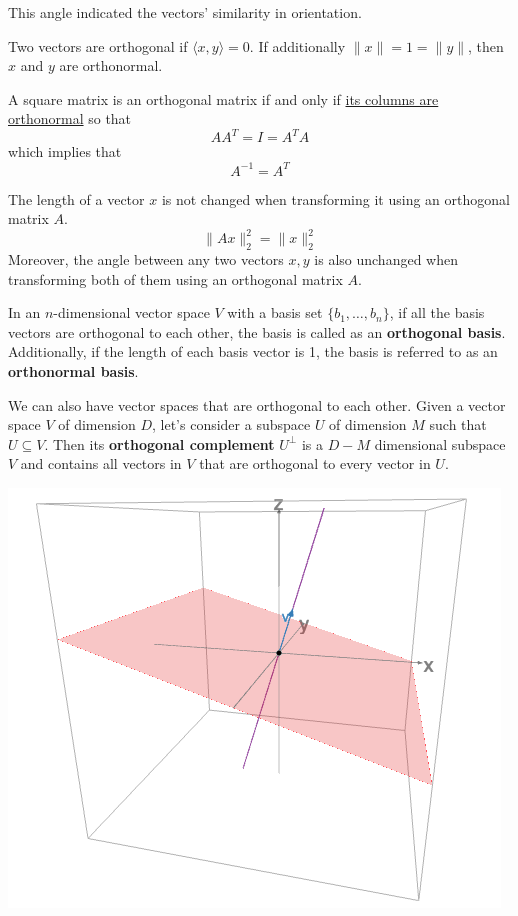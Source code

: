 \documentclass{article}
\begin{document}
This angle indicated the vectors' similarity in orientation. 
\begin{definition}
    Two vectors are orthogonal if $\langle x,y \rangle=0$. If additionally
    $\lVert x\rVert=1=\lVert y\rVert$, then $x$ and $y$ are orthonormal.
\end{definition}
\begin{definition}
    A square matrix is an orthogonal matrix if and only if \underline{its columns are
    orthonormal} so that 
    $$AA^T=I=A^TA$$
    which implies that 
    $$A^{-1}=A^T$$
\end{definition}
The length of a vector $x$ is not changed when transforming it using an
orthogonal matrix $A$.
$$\lVert Ax\rVert_2^2=\lVert x\rVert_2^2$$
Moreover, the angle between any two vectors $x,y$ is also unchanged when
transforming both of them using an orthogonal matrix $A$.
\begin{definition}
    In an $n$-dimensional vector space $V$ with a basis set
    $\{b_1,\ldots,b_n\}$, if all the basis vectors are orthogonal to each
    other, the basis is called as an \textbf{orthogonal basis}.
    Additionally, if the length of each basis vector is 1, the basis is
    referred to as an \textbf{orthonormal basis}.
\end{definition}
We can also have vector spaces that are orthogonal to each other. Given a
vector space $V$ of dimension $D$, let's  consider a subspace $U$ of dimension
$M$ such that $U\subseteq V$. Then its \textbf{orthogonal complement}
$U^{\perp}$ is a $D-M$ dimensional subspace $V$ and contains all vectors in
$V$ that are orthogonal to every vector in $U$.
\begin{center}
    \includegraphics[width=0.6\linewidth]{images/orthogonal_complement}
\end{center}
\end{document}
